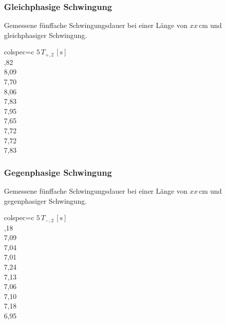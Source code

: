 \subsubsection{Gleichphasige Schwingung}
\label{sec:GleichphasigeSchwingung_LangesPendel}
\begin{table}[H]
  \centering
  \caption{Gemessene fünffache Schwingungsdauer bei einer Länge von $xx\, \unit{\centi\meter}$ und gleichphasiger Schwingung.}
  \label{tab:GleichphasigeSchwingung_L2}
  \begin{tblr}{colspec={c}}
      \toprule
      $5\, T_{+, 2}\,\left[\unit{\second}\right]$\\
      ,82 \\
      8,09 \\
      7,70 \\
      8,06 \\
      7,83 \\
      7,95 \\
      7,65 \\
      7,72 \\
      7,72 \\
      7,83 \\
      \bottomrule
  \end{tblr}
\end{table}
%
%
\subsubsection{Gegenphasige Schwingung}
\label{sec:GegenphasigeSchwingung_LangesPendel}
\begin{table}[H]
  \centering
  \caption{Gemessene fünffache Schwingungsdauer bei einer Länge von $xx\, \unit{\centi\meter}$ und gegenphasiger Schwingung.}
  \label{tab:GegenphasigeSchwingung_L2}
  \begin{tblr}{colspec={c}}
      \toprule
      $5\, T_{-, 2}\,\left[\unit{\second}\right]$\\
      ,18 \\
      7,09 \\
      7,04 \\
      7,01 \\
      7,24 \\
      7,13 \\
      7,06 \\
      7,10 \\
      7,18 \\
      6,95 \\
      \bottomrule
  \end{tblr}
\end{table}
%
%
